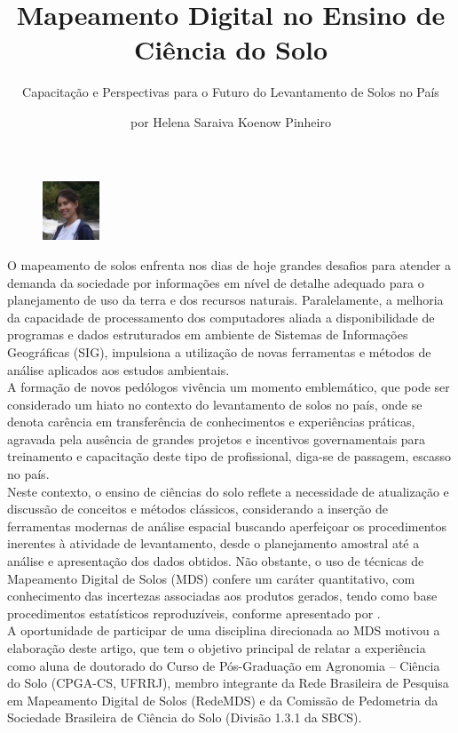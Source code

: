 \title{Mapeamento Digital no Ensino de Ciência do Solo}
\subtitle{Capacitação e Perspectivas para o Futuro do Levantamento de Solos no País}
\author{por Helena Saraiva Koenow Pinheiro}
\maketitle
\begin{figure}
\includegraphics[width=0.15\textwidth]{figuras/helena}
\end{figure}
O mapeamento de solos enfrenta nos dias de hoje grandes desafios para atender a demanda da sociedade por informações em nível de detalhe adequado para o planejamento de uso da terra e dos recursos naturais. Paralelamente, a melhoria da capacidade de processamento dos computadores aliada a disponibilidade de programas e dados estruturados em ambiente de Sistemas de Informações Geográficas (SIG), impulsiona a utilização de novas ferramentas e métodos de análise aplicados aos estudos ambientais.\\
A formação de novos pedólogos vivência um momento emblemático, que pode ser considerado um hiato no contexto do levantamento de solos no país, onde se denota carência em transferência de conhecimentos e experiências práticas, agravada pela ausência de grandes projetos e incentivos governamentais para treinamento e capacitação deste tipo de profissional, diga-se de passagem, escasso no país.\\
Neste contexto, o ensino de ciências do solo reflete a necessidade de atualização e discussão de conceitos e métodos clássicos, considerando a inserção de ferramentas modernas de análise espacial buscando aperfeiçoar os procedimentos inerentes à atividade de levantamento, desde o planejamento amostral até a análise e apresentação dos dados obtidos. Não obstante, o uso de técnicas de Mapeamento Digital de Solos (MDS) confere um caráter quantitativo, com conhecimento das incertezas associadas aos produtos gerados, tendo como base procedimentos estatísticos reproduzíveis, conforme apresentado por \cite{CarvalhoJuniorEtAl:2011, ChagasEtAl:2011, CrivelentiEtAl:2009, GiassonEtAl:2006, WiesmeierEtAl:2010, tenCatenEtAl:2011}.\\
A oportunidade de participar de uma disciplina direcionada ao MDS motivou a elaboração deste artigo, que tem o objetivo principal de relatar a experiência como aluna de doutorado do Curso de Pós-Graduação em Agronomia -- Ciência do Solo (CPGA-CS, UFRRJ), membro integrante da Rede Brasileira de Pesquisa em Mapeamento Digital de Solos (RedeMDS) e da Comissão de Pedometria da Sociedade Brasileira de Ciência do Solo (Divisão 1.3.1 da SBCS).\\
